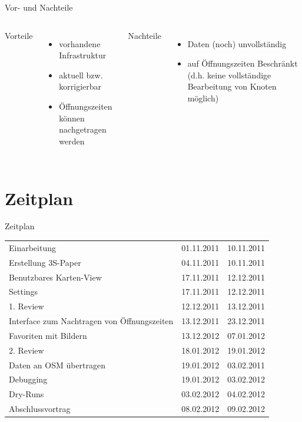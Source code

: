 \documentclass[hyperref]{beamer}
\begin{document}
\begin{frame}{Vor- und Nachteile}
	\begin{columns}
		\column{5.1cm}
		Vorteile
		\begin{itemize}
			\item vorhandene Infrastruktur
			\item aktuell bzw. korrigierbar
			\item Öffnungszeiten können nachgetragen werden \phantom{~~~~~~~~~~~~~~}
		\end{itemize}		
		\column{6cm}
		Nachteile
		\begin{itemize}
			\item Daten (noch) unvollständig
			\item auf Öffnungszeiten Beschränkt (d.h. keine vollständige Bearbeitung von Knoten möglich)
		\end{itemize}
	\end{columns}
\end{frame}

\section{Zeitplan}



\begin{frame}{Zeitplan}

		\begin{tabular}{l l l}
			Einarbeitung & 01.11.2011 & 10.11.2011\\
			Erstellung 3S-Paper & 04.11.2011 & 10.11.2011\\
			Benutzbares Karten-View & 17.11.2011 & 12.12.2011\\
			Settings & 17.11.2011 & 12.12.2011 \\
			1. Review & 12.12.2011 & 13.12.2011\\
			Interface zum Nachtragen von Öffnungszeiten & 13.12.2011 & 23.12.2011\\
			Favoriten mit Bildern & 13.12.2012 & 07.01.2012\\
			2. Review & 18.01.2012 & 19.01.2012\\
			Daten an OSM übertragen & 19.01.2012 & 03.02.2011\\
			Debugging & 19.01.2012 & 03.02.2012\\
			Dry-Runs & 03.02.2012 & 04.02.2012\\
			Abschlussvortrag & 08.02.2012 & 09.02.2012\\
		\end{tabular}

\end{frame}
\end{document}
